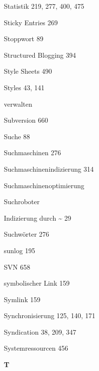 \documentclass{book}
\renewcommand\indexspace{\vspace{11pt}}
\renewcommand\subitem{\par}
\begin{document}
\begin{multicols}{2}
\begin{osp-index}
  \item Statistik\hspace{1mm} 219, 277, 400, 475
  \item Sticky Entries\hspace{1mm} 269
  \item Stoppwort\hspace{1mm} 89
  \item Structured Blogging\hspace{1mm} 394
  \item Style Sheets\hspace{1mm} 490
  \item Styles\hspace{1mm} 43, 141
    \subitem verwalten\hspace{1mm} 
  \item Subversion\hspace{1mm} 660
  \item Suche\hspace{1mm} 88
  \item Suchmaschinen\hspace{1mm} 276
  \item Suchmaschinenindizierung\hspace{1mm} 314
  \item Suchmaschinenoptimierung\hspace{1mm} 
  \item Suchroboter
    \subitem Indizierung durch \textasciitilde\hspace{1mm} 29
  \item Suchw\"orter\hspace{1mm} 276
  \item sunlog\hspace{1mm} 195
  \item SVN\hspace{1mm} 658
  \item symbolischer Link\hspace{1mm} 159
  \item Symlink\hspace{1mm} 159
  \item Synchronisierung\hspace{1mm} 125, 140, 171
  \item Syndication\hspace{1mm} 38, 209, 347
  \item Systemressourcen\hspace{1mm} 456

  \indexspace
{\sffamily\bfseries T}\nopagebreak


\end{osp-index}
\end{multicols}
\end{document}
